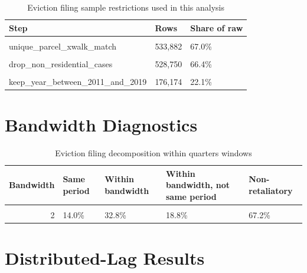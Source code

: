 \documentclass[
  11pt,
]{article}
\begin{document}
\begin{table}[!h]
\centering
\caption{\label{tab:sample-restrictions}Eviction filing sample restrictions used in this analysis}
\centering
\fontsize{8}{10}\selectfont
\begin{tabular}[t]{lll}
\toprule
Step & Rows & Share of raw\\
\midrule
\cellcolor{gray!10}{raw\_evictions\_clean\_rows} & \cellcolor{gray!10}{796,440} & \cellcolor{gray!10}{100.0\%}\\
unique\_parcel\_xwalk\_match & 533,882 & 67.0\%\\
\cellcolor{gray!10}{drop\_commercial\_cases} & \cellcolor{gray!10}{532,945} & \cellcolor{gray!10}{66.9\%}\\
drop\_non\_residential\_cases & 528,750 & 66.4\%\\
\cellcolor{gray!10}{keep\_nonpayment\_of\_rent\_cases\_a\_flag} & \cellcolor{gray!10}{338,850} & \cellcolor{gray!10}{42.5\%}\\
\addlinespace
keep\_year\_between\_2011\_and\_2019 & 176,174 & 22.1\%\\
\bottomrule
\end{tabular}
\end{table}

\newpage

\section{Bandwidth Diagnostics}\label{bandwidth-diagnostics}

\begin{table}[!h]
\centering
\caption{\label{tab:bandwidth-summary}Eviction filing decomposition within quarters windows}
\centering
\fontsize{9}{11}\selectfont
\begin{tabular}[t]{rllll}
\toprule
Bandwidth & Same period & Within bandwidth & Within bandwidth, not same period & Non-retaliatory\\
\midrule
\cellcolor{gray!10}{1} & \cellcolor{gray!10}{14.0\%} & \cellcolor{gray!10}{26.3\%} & \cellcolor{gray!10}{12.3\%} & \cellcolor{gray!10}{73.7\%}\\
2 & 14.0\% & 32.8\% & 18.8\% & 67.2\%\\
\bottomrule
\end{tabular}
\end{table}

\newpage

\section{Distributed-Lag Results}\label{distributed-lag-results}
\end{document}
